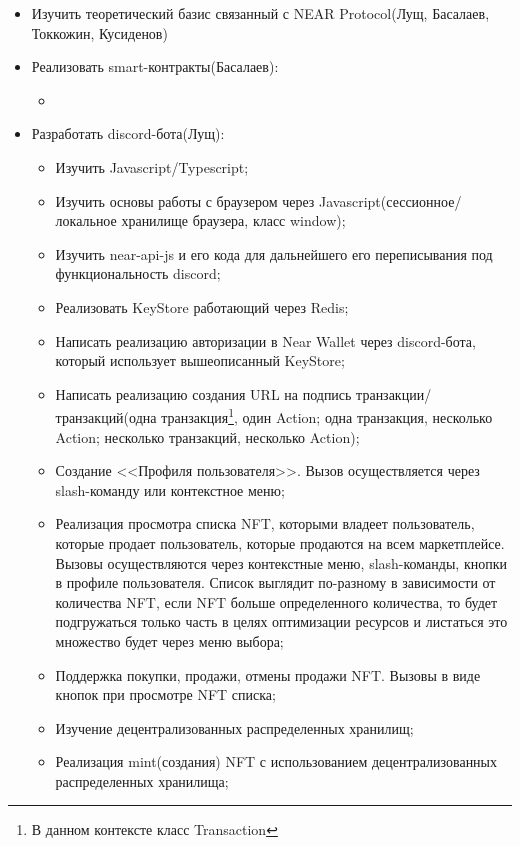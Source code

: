 \begin{itemize}
    \item Изучить теоретический базис связанный с NEAR Protocol(Лущ, Басалаев, Токкожин, Кусиденов)
    \item Реализовать smart-контракты(Басалаев):
    \begin{itemize}
        \item
    \end{itemize}
    \item Разработать discord-бота(Лущ):
    \begin{itemize}
        \item Изучить Javascript/Typescript;
        \item Изучить основы работы с браузером через Javascript(сессионное/локальное хранилище браузера, класс window);
        \item Изучить near-api-js и его кода для дальнейшего его переписывания под функциональность discord;
        \item Реализовать KeyStore\cite{nearclasskeystore} работающий через Redis\cite{redis};
        \item Написать реализацию авторизации в Near Wallet\cite{nearwallet} через discord-бота, который использует вышеописанный KeyStore;
        \item Написать реализацию создания URL на подпись транзакции/транзакций(одна транзакция\footnote{В данном контексте класс Transaction\cite{nearclasstransaction}}, один Action\cite{nearclassaction}; одна транзакция, несколько Action; несколько транзакций, несколько Action);
        \item Создание <<Профиля пользователя>>. Вызов осуществляется через slash-команду\cite{discordjsslashcommands} или контекстное меню;
        \item Реализация просмотра списка NFT, которыми владеет пользователь, которые продает пользователь, которые продаются на всем маркетплейсе. Вызовы осуществляются через контекстные меню, slash-команды, кнопки в профиле пользователя. Список выглядит по-разному в зависимости от количества NFT, если NFT больше определенного количества, то будет подгружаться только часть в целях оптимизации ресурсов и листаться это множество будет через меню выбора;
        \item Поддержка покупки, продажи, отмены продажи NFT. Вызовы в виде кнопок при просмотре NFT списка;
        \item Изучение децентрализованных распределенных хранилищ;
        \item Реализация mint(создания) NFT с использованием децентрализованных распределенных хранилища;

\end{itemize}
\end{itemize}
